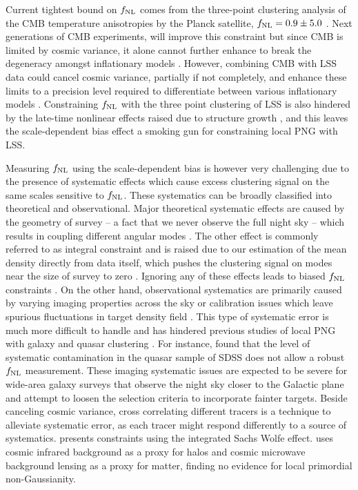 Current tightest bound on $f_{\rm NL}$ comes from the three-point clustering analysis of the CMB temperature anisotropies by the Planck satellite, $f_{\rm NL}=0.9\pm 5.0$ \citep{akrami2019planck}. Next generations of CMB experiments, will improve this constraint but since CMB is limited by cosmic variance, it alone cannot further enhance to break the degeneracy amongst inflationary models . However, combining CMB with LSS data could cancel cosmic variance, partially if not completely, and enhance these limits to a precision level required to differentiate between various inflationary models \citep[see, e.g.,][]{schmittfull2018PhRvD}.  Constraining $f_{\rm NL}$ with the three point clustering of LSS is also hindered by the late-time nonlinear effects raised due to structure growth , and this leaves the scale-dependent bias effect a smoking gun for constraining local PNG with LSS. 

Measuring $f_{\rm NL}$ using the scale-dependent bias is however very challenging due to the presence of systematic effects which cause excess clustering signal on the same scales sensitive to $f_{\rm NL}$. These systematics can be broadly classified into theoretical and observational. Major theoretical systematic effects are caused by the geometry of survey -- a fact that we never observe the full night sky -- which results in coupling different angular modes . The other effect is commonly referred to as integral constraint and is raised due to our estimation of the mean density directly from data itself, which pushes the clustering signal on modes near the size of survey to zero . Ignoring any of these effects leads to biased $f_{\rm NL}$ constraints . On the other hand, observational systematics are primarily caused by varying imaging properties across the sky or calibration issues which leave spurious fluctuations in target density field . This type of systematic error is much more difficult to handle and has hindered previous studies of local PNG with galaxy and quasar clustering \citep[see, e.g.,][]{Ho2015JCAP...05..040H}. For instance, \cite{pullen2013systematic} found that the level of systematic contamination in the quasar sample of SDSS  does not allow a robust $f_{\rm NL}$ measurement. These imaging systematic issues are expected to be severe for wide-area galaxy surveys that observe the night sky closer to the Galactic plane and attempt to loosen the selection criteria to incorporate fainter targets. Beside canceling cosmic variance, cross correlating different tracers is a technique to alleviate systematic error, as each tracer might respond differently to a source of systematics.  presents constraints using the integrated Sachs Wolfe effect.  uses cosmic infrared background as a proxy for halos and cosmic microwave background lensing as a proxy for matter, finding no evidence for local primordial non-Gaussianity. 


